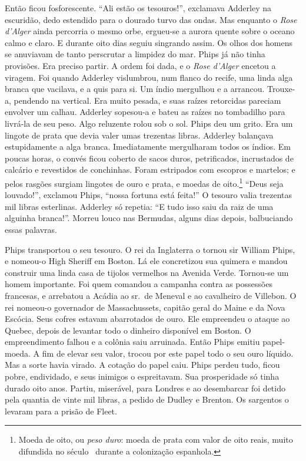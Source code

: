 Então ficou fosforescente. “Ali estão os tesouros!”, exclamava Adderley na
escuridão, dedo estendido para o dourado turvo das ondas. Mas enquanto o
\textit{Rose d’Alger} ainda percorria o mesmo orbe, ergueu-se a aurora
quente sobre o oceano calmo e claro. E durante oito dias seguiu singrando
assim. Os olhos dos homens se anuviavam de tanto perscrutar a limpidez do
mar. Phips já não tinha provisões. Era preciso partir. A ordem foi dada, e
o \textit{Rose d’Alger} encetou a viragem. Foi quando Adderley vislumbrou,
num flanco do recife, uma linda alga branca que vacilava, e a quis para
si. Um índio mergulhou e a arrancou. Trouxe-a, pendendo na vertical. Era
muito pesada, e suas raízes retorcidas pareciam envolver um calhau.
Adderley sopesou-a e bateu as raízes no tombadilho para livrá-la de seu
peso. Algo reluzente rolou sob o sol. Phips deu um grito. Era um lingote
de prata que devia valer umas trezentas libras. Adderley balançava
estupidamente a alga branca. Imediatamente mergulharam todos os índios. Em
poucas horas, o convés ficou coberto de sacos duros, petrificados,
incrustados de calcário e revestidos de conchinhas. Foram estripados com
escopros e martelos; e pelos rasgões surgiam lingotes de ouro e prata, e
moedas de oito.\footnote{ Moeda de oito, ou \textit{peso duro}: moeda de
prata com valor de oito reais, muito difundida no século~ durante a
colonização espanhola.} “Deus seja louvado!'', exclamou Phips, ``nossa
fortuna está feita!” O tesouro valia trezentas mil libras esterlinas.
Adderley só repetia: “E tudo isso saiu da raiz de uma alguinha branca!”.
Morreu louco nas Bermudas, alguns dias depois, balbuciando essas palavras.

Phips transportou o seu tesouro. O rei da Inglaterra o tornou sir William
Phips, e nomeou-o High Sheriff em Boston. Lá ele concretizou sua quimera e
mandou construir uma linda casa de tijolos vermelhos na Avenida Verde.
Tornou-se um homem importante. Foi quem comandou a campanha contra as
possessões francesas, e arrebatou a Acádia ao sr.~de Meneval e ao
cavalheiro de Villebon. O rei nomeou-o governador de Massachussets,
capitão geral do Maine e da Nova Escócia. Seus cofres estavam abarrotados
de ouro. Ele empreendeu o ataque ao Quebec, depois de levantar todo o
dinheiro disponível em Boston. O empreendimento falhou e a colônia saiu
arruinada. Então Phips emitiu papel-moeda. A fim de elevar seu valor,
trocou por este papel todo o seu ouro líquido. Mas a sorte havia virado. A
cotação do papel caiu. Phips perdeu tudo, ficou pobre, endividado, e seus
inimigos o espreitavam. Sua prosperidade só tinha durado oito anos.
Partiu, miserável, para Londres e ao desembarcar foi detido pela quantia
de vinte mil libras, a pedido de Dudley e Brenton. Os sargentos o levaram
para a prisão de Fleet.

